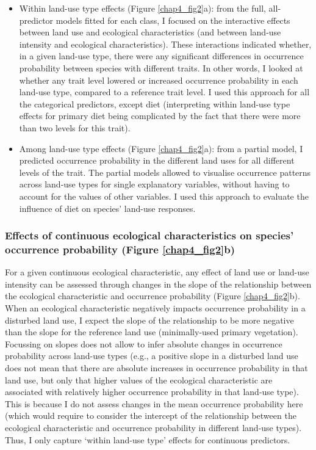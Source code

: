 \begin{itemize}
\item
Within land-use type effects (Figure \ref{chap4_fig2}a): from the full, all-predictor models fitted for each class, I focused on the interactive effects between land use and ecological characteristics (and between land-use intensity and ecological characteristics). These interactions indicated whether, in a given land-use type, there were any significant differences in occurrence probability between species with different traits. In other words, I looked at whether any trait level lowered or increased occurrence probability in each land-use type, compared to a reference trait level. I used this approach for all the categorical predictors, except diet (interpreting within land-use type effects for primary diet being complicated by the fact that there were more than two levels for this trait).  
\item
Among land-use type effects (Figure \ref{chap4_fig2}a): from a partial model, I predicted occurrence probability in the different land uses for all different levels of the trait. The partial models allowed to visualise occurrence patterns across land-use types for single explanatory variables, without having to account for the values of other variables. I used this approach to evaluate the influence of diet on species' land-use responses.
\end{itemize}


\subsubsection{Effects of continuous ecological characteristics on species’ occurrence probability (Figure \ref{chap4_fig2}b)}
For a given continuous ecological characteristic, any effect of land use or land-use intensity can be assessed through changes in the slope of the relationship between the ecological characteristic and occurrence probability (Figure \ref{chap4_fig2}b). When an ecological characteristic negatively impacts occurrence probability in a disturbed land use, I expect the slope of the relationship to be more negative than the slope for the reference land use (minimally-used primary vegetation). Focussing on slopes does not allow to infer absolute changes in occurrence probability across land-use types (e.g., a positive slope in a disturbed land use does not mean that there are absolute increases in occurrence probability in that land use, but only that higher values of the ecological characteristic are associated with relatively higher occurrence probability in that land-use type). This is because I do not assess changes in the mean occurrence probability here (which would require to consider the intercept of the relationship between the ecological characteristic and occurrence probability in different land-use types). Thus, I only capture `within land-use type' effects for continuous predictors.

